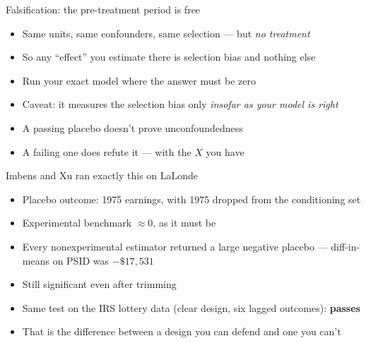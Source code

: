 \documentclass{beamer}
\newcommand{\highlight}[1]{\textcolor{accent}{\textbf{#1}}}
\begin{document}
\begin{frame}{Falsification: the pre-treatment period is free}

\begin{itemize}
\item Same units, same confounders, same selection --- but \emph{no treatment}
\item So any ``effect'' you estimate there is selection bias and nothing else
\item Run your exact model where the answer must be zero
\end{itemize}

\vspace{0.7em}

\begin{itemize}
\item Caveat: it measures the selection bias only \emph{insofar as your model is right}
\item A passing placebo doesn't prove unconfoundedness
\item A failing one does refute it --- with the $X$ you have
\end{itemize}

\end{frame}


\begin{frame}{Imbens and Xu ran exactly this on LaLonde}

\begin{itemize}
\item Placebo outcome: 1975 earnings, with 1975 dropped from the conditioning set
\item Experimental benchmark $\approx 0$, as it must be
\item \alert{Every nonexperimental estimator returned a large negative placebo} --- diff-in-means on PSID was $-\$17{,}531$
\item Still significant even after trimming
\end{itemize}

\vspace{0.6em}

\begin{itemize}
\item Same test on the IRS lottery data (clear design, six lagged outcomes): \highlight{passes}
\item That is the difference between a design you can defend and one you can't
\end{itemize}

\end{frame}
\end{document}

